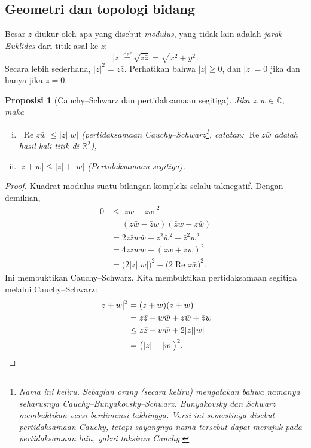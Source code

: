 \documentclass[12pt,openany]{book}
\renewcommand{\Re}{\operatorname{Re}}
\newcommand{\sabs}[1]{\lvert {#1} \rvert}
\newcommand{\C}{{\mathbb{C}}}
\newcommand{\R}{{\mathbb{R}}}
\newcommand{\myindex}[1]{#1\index{#1}}
\theoremstyle{plain}
\newtheorem{prop}[thm]{Proposisi}
\theoremstyle{remark}
\theoremstyle{definition}
\theoremstyle{exercise}
\theoremstyle{example}
\begin{document}
\subsection{Geometri dan topologi bidang}

Besar $z$ diukur oleh apa yang disebut \emph{\myindex{modulus}},
yang tidak lain adalah \emph{\myindex{jarak Euklides}}
dari titik asal ke $z$:
%
\begin{equation*}
\sabs{z} \overset{\text{def}}{=} \sqrt{z \bar{z}} = \sqrt{x^2+y^2} .
\end{equation*}
Secara lebih sederhana, ${\sabs{z}}^2 = z\bar{z}$.
Perhatikan bahwa $\sabs{z} \geq 0$, dan $\sabs{z} = 0$
jika dan hanya jika $z=0$.

\begin{prop}[Cauchy--Schwarz dan pertidaksamaan segitiga]
Jika $z,w \in \C$, maka
\begin{enumerate}[(i)]
\item
$\sabs{\Re z\bar{w}} \leq \sabs{z} \sabs{w}$ \quad (pertidaksamaan Cauchy--Schwarz\footnote{%
Nama ini keliru.
Sebagian orang (secara keliru) mengatakan bahwa namanya seharusnya Cauchy--Bunyakovsky--Schwarz.
Bunyakovsky dan Schwarz membuktikan versi berdimensi takhingga.
Versi ini semestinya disebut
pertidaksamaan Cauchy, tetapi sayangnya nama tersebut dapat merujuk pada
pertidaksamaan lain, yakni taksiran Cauchy.}, catatan: $\Re z
\bar{w}$ adalah hasil kali titik di $\R^2$),
\item
$\sabs{z+w} \leq \sabs{z} + \sabs{w}$ \quad (Pertidaksamaan segitiga).%
\end{enumerate}
\end{prop}

\begin{proof}
Kuadrat modulus suatu bilangan kompleks selalu taknegatif.
Dengan demikian,
\begin{equation*}
\begin{split}
0 & \leq {\sabs{z\bar{w}-\bar{z}w}}^2 \\
  & =    (z\bar{w}-\bar{z}w)(\bar{z}w-z\bar{w}) \\
  & =    2z\bar{z}w\bar{w} - z^2\bar{w}^2 - \bar{z}^2w^2 \\
  & =    4z\bar{z}w\bar{w} - {(z\bar{w}+\bar{z}w)}^2 \\
  & =    {\bigl(2\sabs{z}\sabs{w}\bigr)}^2 - {\bigl(2 \Re z\bar{w}\bigr)}^2 .
\end{split}
\end{equation*}
Ini membuktikan Cauchy--Schwarz.  Kita membuktikan pertidaksamaan segitiga
melalui Cauchy--Schwarz:
\begin{equation*}
\begin{split}
{\sabs{z+w}}^2 & =    (z+w)(\bar{z}+\bar{w}) \\
               & =    z\bar{z} + w\bar{w} + z\bar{w} + \bar{z}w \\
               & \leq z\bar{z} + w\bar{w} + 2 \sabs{z}\sabs{w} \\
               & =    {\bigl(\sabs{z}+\sabs{w}\bigr)}^2 . \qedhere
\end{split}
\end{equation*}
\end{proof}
\end{document}
